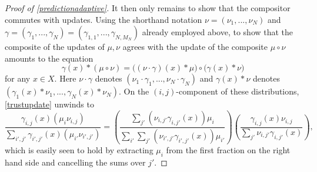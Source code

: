 \documentclass{eptcs}
\theoremstyle{definition}
\theoremstyle{plain}
\newcommand{\0}{\textsf{0}}
\newcommand{\1}{\tn{\textsf{1}}}
\begin{document}
\begin{proof}[Proof of \cref{predictionadaptive}]
It then only remains to show that the compositor commutes with updates. Using the shorthand notation $\nu = (\nu_1,...,\nu_N)$ and $\gamma = (\gamma_1,...,\gamma_N) = (\gamma_{1,1},...,\gamma_{N,M_N})$ already employed above, to show that the composite of the updates of $\mu,\nu$ agrees with the update of the composite $\mu \circ \nu$ amounts to the equation
\begin{equation}\label{trustupdate}
\gamma(x) * (\mu \circ \nu) = \big((\nu \cdot \gamma)(x) * \mu\big) \circ \big(\gamma(x) * \nu\big)
\end{equation}
for any $x \in X$. Here $\nu \cdot \gamma$ denotes $(\nu_1 \cdot \gamma_1,...,\nu_N \cdot \gamma_N)$ and $\gamma(x) * \nu$ denotes $(\gamma_1(x) * \nu_1,...,\gamma_N(x) * \nu_N)$. On the $(i,j)$-component of these distributions, \eqref{trustupdate} unwinds to
\[
\frac{\gamma_{i,j}(x)(\mu_i\nu_{i,j})}{\sum_{i',j'}\gamma_{i',j'}(x)(\mu_{i'}\nu_{i',j'})} = \left(\frac{\sum_{j'}(\nu_{i,j'}\gamma_{i,j'}(x))\mu_i}{\sum_{i'}\sum_{j'}(\nu_{i',j'}\gamma_{i',j'}(x))\mu_{i'}}\right)\left(\frac{\gamma_{i,j}(x)\nu_{i,j}}{\sum_{j'}\nu_{i,j'}\gamma_{i,j'}(x)}\right),
\]
which is easily seen to hold by extracting $\mu_i$ from the first fraction on the right hand side and cancelling the sums over $j'$.
\end{proof}
\end{document}
